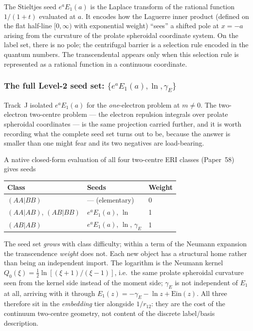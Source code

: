 \documentclass[aps,pra,twocolumn,superscriptaddress,longbibliography]{revtex4-2}
\begin{document}
The Stieltjes seed $e^a E_1(a)$ is the Laplace transform of the
rational function $1/(1+t)$ evaluated at $a$.  It encodes how
the Laguerre inner product (defined on the flat half-line
$[0, \infty)$ with exponential weight) ``sees'' a shifted pole
at $x = -a$ arising from the curvature of the prolate spheroidal
coordinate system.  On the label set, there is no pole; the
centrifugal barrier is a selection rule encoded in the quantum
numbers.  The transcendental appears only when this selection
rule is represented as a rational function in a continuous
coordinate.

\subsubsection{The full Level-2 seed set: $\{e^a E_1(a), \ln, \gamma_E\}$}
\label{sec:level2_seed_set}

Track~J isolated $e^a E_1(a)$ for the \emph{one}-electron problem at
$m \neq 0$.  The two-electron two-centre problem --- the electron
repulsion integrals over prolate spheroidal coordinates --- is the
same projection carried further, and it is worth recording what the
complete seed set turns out to be, because the answer is smaller than
one might fear and its two negatives are load-bearing.

A native closed-form evaluation of all four two-centre ERI classes
(Paper~58) gives seeds
\begin{center}
\begin{tabular}{lll}
\hline
Class & Seeds & Weight \\
\hline
$(AA|BB)$ & --- (elementary) & 0 \\
$(AA|AB)$, $(AB|BB)$ & $e^a E_1(a)$, $\ln$ & 1 \\
$(AB|AB)$ & $e^a E_1(a)$, $\ln$, $\gamma_E$ & 1 \\
\hline
\end{tabular}
\end{center}
The seed set \emph{grows} with class difficulty; within a term of the
Neumann expansion the transcendence \emph{weight} does not.  Each new object has a structural home rather
than being an independent import.  The logarithm is the Neumann kernel
$Q_0(\xi) = \tfrac12\ln[(\xi{+}1)/(\xi{-}1)]$, i.e.\ the same prolate
spheroidal curvature seen from the kernel side instead of the moment
side; $\gamma_E$ is not independent of $E_1$ at all, arriving with it
through $E_1(z) = -\gamma_E - \ln z + \mathrm{Ein}(z)$.  All three
therefore sit in the \emph{embedding} tier alongside $1/r_{12}$: they
are the cost of the continuum two-centre geometry, not content of the
discrete label/basis description.
\end{document}
